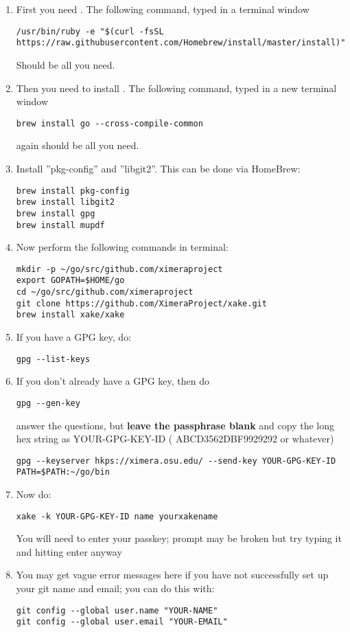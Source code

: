 \documentclass{ximera}
\begin{document}
\begin{enumerate}
\item First you need . The following command, typed in a terminal window
\begin{verbatim}
/usr/bin/ruby -e "$(curl -fsSL https://raw.githubusercontent.com/Homebrew/install/master/install)"
\end{verbatim}
Should be all you need. 
\item Then you need to install . The following command, typed in a new terminal window
\begin{verbatim}
brew install go --cross-compile-common
\end{verbatim}
again should be all you need.
\item Install ''pkg-config” and ''libgit2”. This can be done via HomeBrew:
\begin{verbatim}
brew install pkg-config
brew install libgit2
brew install gpg
brew install mupdf
\end{verbatim}
\item Now perform the following commands in terminal:
\begin{verbatim}
mkdir -p ~/go/src/github.com/ximeraproject
export GOPATH=$HOME/go
cd ~/go/src/github.com/ximeraproject
git clone https://github.com/XimeraProject/xake.git
brew install xake/xake
\end{verbatim}
\item If you have a GPG key, do:
\begin{verbatim}
gpg --list-keys
\end{verbatim}
\item If you don’t already have a GPG key, then do
\begin{verbatim}
gpg --gen-key
\end{verbatim}
answer the questions, but \textbf{leave the passphrase blank} and copy the long hex string as YOUR-GPG-KEY-ID ( ABCD3562DBF9929292 or whatever)
\begin{verbatim}
gpg --keyserver hkps://ximera.osu.edu/ --send-key YOUR-GPG-KEY-ID
PATH=$PATH:~/go/bin
\end{verbatim}
\item Now do: 
\begin{verbatim}
xake -k YOUR-GPG-KEY-ID name yourxakename
\end{verbatim}
You will need to enter your passkey; prompt may be broken but try typing it and hitting enter anyway

\item You may get vague error messages here if you have not successfully set up your git name and email; you can do this with:
\begin{verbatim}
git config --global user.name "YOUR-NAME"
git config --global user.email "YOUR-EMAIL"
\end{verbatim}
\end{enumerate}
\end{document}
